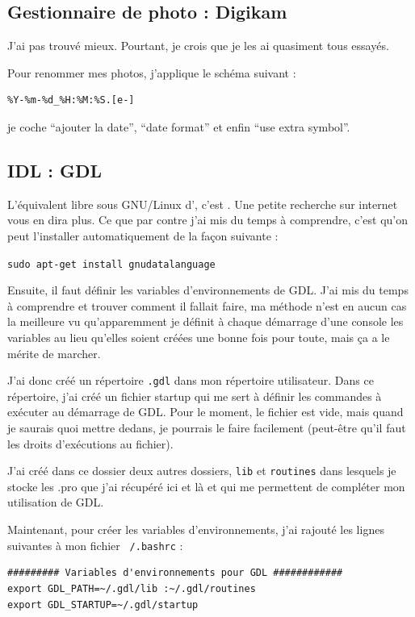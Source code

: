 \documentclass[a4paper,twoside]{article}
\begin{document}
\subsection{Gestionnaire de photo : Digikam}
J'ai pas trouvé mieux. Pourtant, je crois que je les ai quasiment tous essayés.

Pour renommer mes photos, j'applique le schéma suivant :
\begin{verbatim}
%Y-%m-%d_%H:%M:%S.[e-]
\end{verbatim}
je coche ``ajouter la date'', ``date format'' et enfin ``use extra symbol''.


\subsection{IDL : GDL}
L'équivalent libre sous GNU/Linux d', c'est . Une petite recherche sur internet vous en dira plus. Ce que par contre j'ai mis du temps à comprendre, c'est qu'on peut l'installer automatiquement de la façon suivante :

\verb|sudo apt-get install gnudatalanguage|

Ensuite, il faut définir les variables d'environnements de GDL. J'ai mis du temps à comprendre et trouver comment il fallait faire, ma méthode n'est en aucun cas la meilleure vu qu'apparemment je définit à chaque démarrage d'une console les variables au lieu qu'elles soient créées une bonne fois pour toute, mais ça a le mérite de marcher.

J'ai donc créé un répertoire \texttt{.gdl} dans mon répertoire utilisateur. Dans ce répertoire, j'ai créé un fichier startup qui me sert à définir les commandes à exécuter au démarrage de GDL. Pour le moment, le fichier est vide, mais quand je saurais quoi mettre dedans, je pourrais le faire facilement (peut-être qu'il faut les droits d'exécutions au fichier).

J'ai créé dans ce dossier deux autres dossiers, \texttt{lib} et \texttt{routines} dans lesquels je stocke les .pro que j'ai récupéré ici et là et qui me permettent de compléter mon utilisation de GDL.

Maintenant, pour créer les variables d'environnements, j'ai rajouté les lignes suivantes à mon fichier \texttt{~/.bashrc} :
\begin{verbatim}
######### Variables d'environnements pour GDL ############
export GDL_PATH=~/.gdl/lib :~/.gdl/routines
export GDL_STARTUP=~/.gdl/startup
\end{verbatim}
\end{document}
